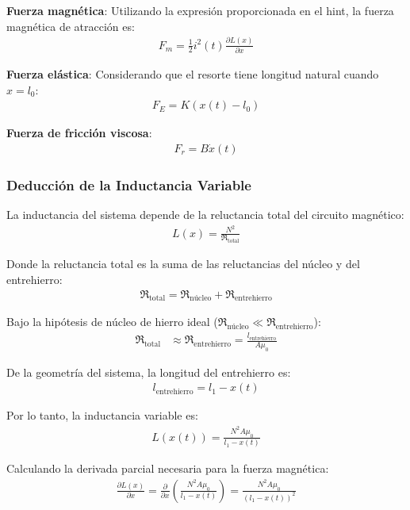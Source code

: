 \documentclass[
  11pt,
  letterpaper,
   addpoints,
   answers
  ]{exam}
\newcommand{\Rel}{\mathfrak{R}} %
\begin{document}
\begin{solution}
    \textbf{Fuerza magnética}: Utilizando la expresión proporcionada en el hint, la fuerza magnética de atracción es:
    \begin{align}
        F_m = \frac{1}{2} i^2(t) \frac{\partial L(x)}{\partial x}
    \end{align}

    \textbf{Fuerza elástica}: Considerando que el resorte tiene longitud natural cuando $x = l_0$:
    \begin{align}
        F_E = K(x(t) - l_0)
    \end{align}

    \textbf{Fuerza de fricción viscosa}:
    \begin{align}
        F_r = B \dot{x}(t)
    \end{align}

    \subsubsection*{Deducción de la Inductancia Variable}
    
    La inductancia del sistema depende de la reluctancia total del circuito magnético:
    \begin{align}
        L(x) = \frac{N^2}{\Rel_{\text{total}}}
    \end{align}

    Donde la reluctancia total es la suma de las reluctancias del núcleo y del entrehierro:
    \begin{align}
        \Rel_{\text{total}} = \Rel_{\text{núcleo}} + \Rel_{\text{entrehierro}}
    \end{align}

    Bajo la hipótesis de núcleo de hierro ideal ($\Rel_{\text{núcleo}} \ll \Rel_{\text{entrehierro}}$):
    \begin{align}
        \Rel_{\text{total}} &\approx \Rel_{\text{entrehierro}} = \frac{l_{\text{entrehierro}}}{A \mu_0}
    \end{align}

    De la geometría del sistema, la longitud del entrehierro es:
    \begin{align}
        l_{\text{entrehierro}} = l_1 - x(t)
    \end{align}

    Por lo tanto, la inductancia variable es:
    \begin{align}
        L(x(t)) = \frac{N^2 A \mu_0}{l_1 - x(t)}
    \end{align}

    Calculando la derivada parcial necesaria para la fuerza magnética:
    \begin{align}
        \frac{\partial L(x)}{\partial x} = \frac{\partial}{\partial x}\left(\frac{N^2 A \mu_0}{l_1 - x(t)}\right) = \frac{N^2 A \mu_0}{(l_1 - x(t))^2}
    \end{align}


\end{solution}
\end{document}
